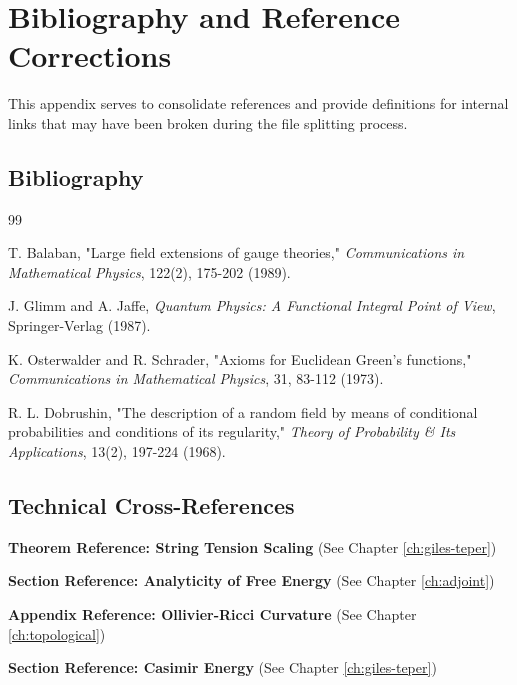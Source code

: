 \chapter{Bibliography and Reference Corrections}
\label{app:reference-corrections}

This appendix serves to consolidate references and provide definitions for internal links that may have been broken during the file splitting process.

\section{Bibliography}
\begin{thebibliography}{99}

 T. Balaban, "Large field extensions of gauge theories," \textit{Communications in Mathematical Physics}, 122(2), 175-202 (1989).

 J. Glimm and A. Jaffe, \textit{Quantum Physics: A Functional Integral Point of View}, Springer-Verlag (1987).

 K. Osterwalder and R. Schrader, "Axioms for Euclidean Green's functions," \textit{Communications in Mathematical Physics}, 31, 83-112 (1973).

 R. L. Dobrushin, "The description of a random field by means of conditional probabilities and conditions of its regularity," \textit{Theory of Probability \& Its Applications}, 13(2), 197-224 (1968).

\end{thebibliography}

\section{Technical Cross-References}

\label{thm:string-tension-scaling}
\textbf{Theorem Reference: String Tension Scaling} (See Chapter \ref{ch:giles-teper})

\label{sec:analyticity-free-energy}
\textbf{Section Reference: Analyticity of Free Energy} (See Chapter \ref{ch:adjoint})

\label{app:ollivier-ricci}
\textbf{Appendix Reference: Ollivier-Ricci Curvature} (See Chapter \ref{ch:topological})

\label{sec:casimir-energy}
\textbf{Section Reference: Casimir Energy} (See Chapter \ref{ch:giles-teper})

